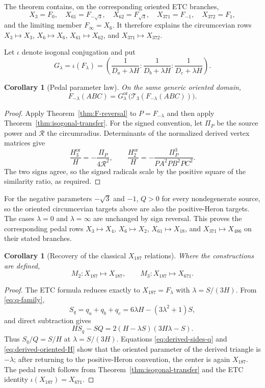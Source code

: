 \documentclass[11pt]{article}
\newtheorem{corollary}[theorem]{Corollary}
\newcommand{\Ped}{\mathcal T_3}
\begin{document}
The theorem contains, on the corresponding oriented ETC branches,
\[
 X_3=F_0,\quad X_{61}=F_{-\sqrt3},\quad X_{62}=F_{\sqrt3},\quad
 X_{371}=F_{-1},\quad X_{372}=F_1,
\]
and the limiting member $F_\infty=X_6$.  It therefore explains the
circumcevian rows $X_3\mapsto X_3$, $X_6\mapsto X_6$,
$X_{61}\mapsto X_{62}$, and $X_{371}\mapsto X_{372}$.

Let $\iota$ denote isogonal conjugation and put
\begin{equation}\label{eq:G-lambda}
 G_\lambda=\iota(F_\lambda)
 =\left(\frac1{D_a+\lambda H}:\frac1{D_b+\lambda H}:
 \frac1{D_c+\lambda H}\right).
\end{equation}

\begin{corollary}[Pedal parameter law]\label{cor:pedal-family}
On the same generic oriented domain,
\begin{equation}\label{eq:F-pedal-law}
 F_{-\lambda}(ABC)=G_\lambda^{\mathrm{or}}
 \bigl(\Ped(F_{-\lambda}(ABC))\bigr).
\end{equation}
\end{corollary}
\begin{proof}
Apply Theorem~\ref{thm:F-reversal} to $P=F_{-\lambda}$ and then apply
Theorem~\ref{thm:isogonal-transfer}.  For the signed convention, let
$\Pi_P$ be the source power and $\mathcal R$ the circumradius.
Determinants of the normalized derived vertex matrices give
\[
 \frac{H_3^{\mathrm{or}}}{H}=-\frac{\Pi_P}{4\mathcal R^2},\qquad
 \frac{H_2^{\mathrm{or}}}{H}=-\frac{\Pi_P^3}{PA^2PB^2PC^2}.
\]
The two signs agree, so the signed radicals scale by the positive
square of the similarity ratio, as required.
\end{proof}
For the negative parameters $-\sqrt3$ and $-1$, $Q>0$ for every
nondegenerate source, so the oriented circumcevian targets above are also
the positive-Heron targets.  The cases $\lambda=0$ and $\lambda=\infty$
are unchanged by sign reversal.  This proves the corresponding pedal rows $X_3\mapsto X_4$,
$X_6\mapsto X_2$, $X_{61}\mapsto X_{18}$, and
$X_{371}\mapsto X_{486}$ on their stated branches.

\begin{corollary}[Recovery of the classical $X_{187}$ relations]\label{cor:x187}
Where the constructions are defined,
\[
 M_2:X_{187}\mapsto X_{187},\qquad
 M_3:X_{187}\mapsto X_{671}.
\]
\end{corollary}
\begin{proof}
The ETC formula reduces exactly to
$X_{187}=F_\lambda$ with $\lambda=S/(3H)$.  From
\eqref{eq:q-family},
\[
 S_q=q_a+q_b+q_c=6\lambda H-(3\lambda^2+1)S,
\]
and direct subtraction gives
\[
 HS_q-SQ=2(H-\lambda S)(3H\lambda-S).
\]
Thus $S_q/Q=S/H$ at $\lambda=S/(3H)$.  Equations
\eqref{eq:derived-sides-q} and \eqref{eq:derived-oriented-H} show that the
oriented parameter of the derived triangle is $-\lambda$; after returning
to the positive-Heron convention, the center is again $X_{187}$.
The pedal result follows from Theorem~\ref{thm:isogonal-transfer} and the
ETC identity $\iota(X_{187})=X_{671}$.
\end{proof}
\end{document}
